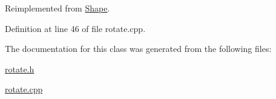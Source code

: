 Reimplemented from \hyperlink{class_shape_af26d06a96ece90a563795ec571451eb1}{Shape}.



Definition at line 46 of file rotate.\+cpp.



The documentation for this class was generated from the following files\+:\begin{DoxyCompactItemize}
\item 
\hyperlink{rotate_8h}{rotate.\+h}\item 
\hyperlink{rotate_8cpp}{rotate.\+cpp}\end{DoxyCompactItemize}

